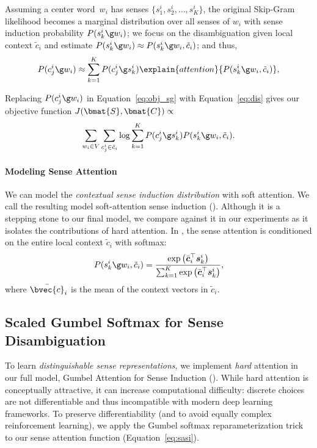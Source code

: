 Assuming a center word~$w_i$ has senses $\{s_1^i, s_2^i, \dots,s_K^i
\}$, the original Skip-Gram likelihood becomes a marginal
distribution over all senses of $w_i$ with sense induction
probability $P(s_k^i \g w_{i})$; we focus on the disambiguation
given local context $\tilde{c}_i$ and estimate $P(s_k^i \g w_{i})  \approx P(s_k^i \g w_{i}, \tilde{c}_i)$;
and thus,
\begin{equation}
  P(c_j^i  \g w_i) \approx \sum_{k=1}^{K} P(c_j^i  \g s_k^i) \explain{attention}{P(s_k^i \g w_{i}, \tilde{c}_i)},
\label{eq:dis}
\end{equation}

Replacing $P(c_j^i \g w_i)$ in Equation~\ref{eq:obj_sg} with
Equation~\ref{eq:dis} gives our objective function $J(\bmat{S},
\bmat{C}) \propto$
\begin{equation}
 \sum_{w_i \in V}\sum_{c_j^i \in \tilde{c}_i} \log
\sum_{k=1}^{K} P(c_j^i  \g s_k^i)P(s_k^i \g w_{i}, \tilde{c}_i).
\label{eq:jatt}
\end{equation}

\paragraph{Modeling Sense Attention}

We can model the \emph{contextual sense induction distribution} with
soft attention. We call the resulting model soft-attention sense
induction (\sasi{}). Although it is a stepping stone to our final
model, we compare against it in our experiments as it isolates the
contributions of hard attention.  In \sasi{}, the sense attention is
conditioned on the entire local context $\tilde{c}_i$ with softmax:
\begin{equation}
P(s_k^i \g w_{i}, \tilde{c}_i) = \frac{\exp \left(\bar{\boldsymbol{c}}_i^{\top}\boldsymbol{s}_k^i\right)}{\sum_{k=1}^{K}\exp \left(\bar{\boldsymbol{c}}_i^{\top}\boldsymbol{s}_k^i \right)},
\label{eq:sasi}
\end{equation}
where $\bar{\bvec{c}}_i$ is the mean of the context vectors in
$\tilde{c}_i$.  

\subsection{Scaled Gumbel Softmax for Sense Disambiguation}
\label{sec:sgs}



To learn \emph{distinguishable sense
  representations}, we implement \emph{hard} attention in our full
model, Gumbel Attention for Sense Induction (\gasi{}).
While hard attention is conceptually attractive, it can increase
computational difficulty: discrete choices are not differentiable and
thus incompatible with modern deep learning frameworks.
To preserve differentiability (and to avoid equally complex
reinforcement learning), we apply the Gumbel softmax
reparameterization trick to our sense attention function
(Equation~\ref{eq:sasi}).
 
